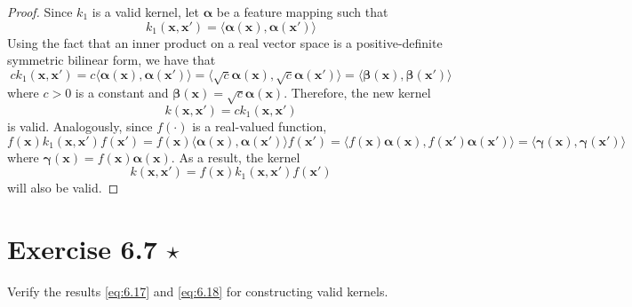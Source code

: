 \vspace{1em}

\begin{proof}
    Since $k_1$ is a valid kernel, let $\bm{\alpha}$ be
    a feature mapping such that
    \[
        k_1(\mathbf{x}, \mathbf{x}') 
        = \langle \bm{\alpha}(\mathbf{x}), \bm{\alpha}(\mathbf{x}') \rangle
    \] 
    Using the fact that an inner product on a real vector space is a 
    positive-definite symmetric bilinear form, we have that
    \[
        ck_1(\mathbf{x}, \mathbf{x}')
        = c \langle \bm{\alpha}(\mathbf{x}), \bm{\alpha}(\mathbf{x}') \rangle
        = \langle \sqrt{c} \bm{\alpha}(\mathbf{x}), \sqrt{c} \bm{\alpha}(\mathbf{x}') \rangle
        = \langle \bm{\beta}(\mathbf{x}), \bm{\beta}(\mathbf{x}') \rangle
    \] 
    where $c > 0$ is a constant and $\bm{\beta}(\mathbf{x}) = \sqrt{c}\bm{\alpha}(\mathbf{x})$.
    Therefore, the new kernel 
    \begin{equation}\label{eq:6.13}\tag{6.13}
        k(\mathbf{x}, \mathbf{x}') = ck_1(\mathbf{x}, \mathbf{x}')
    \end{equation}
    is valid. Analogously, since $f(\cdot)$ is a real-valued function, 
    \[
        f(\mathbf{x}) k_1(\mathbf{x}, \mathbf{x}') f(\mathbf{x}')
        = f(\mathbf{x}) \langle \bm{\alpha}(\mathbf{x}), \bm{\alpha}(\mathbf{x}') \rangle
        f(\mathbf{x}')
        = \langle f(\mathbf{x}) \bm{\alpha}(\mathbf{x}), f(\mathbf{x}') \bm{\alpha}(\mathbf{x}')
        \rangle
        = \langle \bm{\gamma}(\mathbf{x}), \bm{\gamma}(\mathbf{x}') \rangle
    \] 
    where $\bm{\gamma}(\mathbf{x}) = f(\mathbf{x}) \bm{\alpha}(\mathbf{x})$.
    As a result, the kernel
    \begin{equation}\label{eq:6.14}\tag{6.14}
        k(\mathbf{x}, \mathbf{x}') = f(\mathbf{x}) k_1(\mathbf{x}, \mathbf{x}') f(\mathbf{x}')
    \end{equation}
    will also be valid.
\end{proof}

\section*{Exercise 6.7 $\star$}
Verify the results \eqref{eq:6.17} and \eqref{eq:6.18} for constructing valid kernels.

\vspace{1em}

